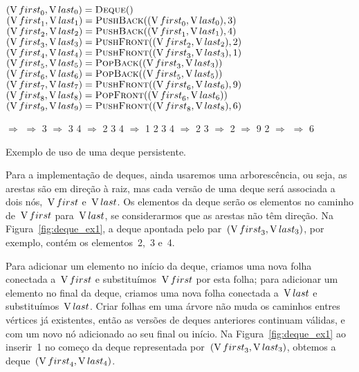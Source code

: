 \documentclass[main.tex]{subfiles}
\begin{document}
\begin{table}
\centering

\begin{subalgorithm}{0.55\textwidth}
\begin{algorithmic}

\State $(\V{first}_0, \V{last}_0) = \Call{Deque}{\null}$
\State $(\V{first}_1, \V{last}_1) = \Call{PushBack}{(\V{first}_0,\V{last}_0), 3}$
\State $(\V{first}_2, \V{last}_2) = \Call{PushBack}{(\V{first}_1,\V{last}_1), 4}$
\State $(\V{first}_3, \V{last}_3) = \Call{PushFront}{(\V{first}_2,\V{last}_2), 2}$
\State $(\V{first}_4, \V{last}_4) = \Call{PushFront}{(\V{first}_3,\V{last}_3), 1}$
\State $(\V{first}_5, \V{last}_5) = \Call{PopBack}{(\V{first}_3,\V{last}_3)}$
\State $(\V{first}_6, \V{last}_6) = \Call{PopBack}{(\V{first}_5,\V{last}_5)}$
\State $(\V{first}_7, \V{last}_7) = \Call{PushFront}{(\V{first}_6,\V{last}_6), 9}$
\State $(\V{first}_8, \V{last}_8) = \Call{PopFront}{(\V{first}_6,\V{last}_6)}$
\State $(\V{first}_9, \V{last}_9) = \Call{PushFront}{(\V{first}_8,\V{last}_8), 6}$

\end{algorithmic}
\end{subalgorithm} \vrule
\begin{subalgorithm}{0.4\textwidth}
\begin{algorithmic}

\State $\Rightarrow$
\State $\Rightarrow$ 3
\State $\Rightarrow$ 3 4
\State $\Rightarrow$ 2 3 4
\State $\Rightarrow$ 1 2 3 4
\State $\Rightarrow$ 2 3
\State $\Rightarrow$ 2
\State $\Rightarrow$ 9 2
\State $\Rightarrow$
\State $\Rightarrow$ 6

\end{algorithmic}
\end{subalgorithm}
\caption{Exemplo de uso de uma deque persistente.} \label{ex:deque}
\end{table}

Para a implementação de deques, ainda usaremos uma arborescência, ou seja, as arestas são em direção à raiz, mas cada versão de uma deque será associada a dois nós,~$\operatorname{V}{first}$ e~$\operatorname{V}{last}$. Os elementos da deque serão os elementos no caminho de~$\operatorname{V}{first}$ para~$\operatorname{V}{last}$, se considerarmos que as arestas não têm direção. Na Figura~\ref{fig:deque_ex1}, a deque apontada pelo par~$(\operatorname{V}{first}_3, \operatorname{V}{last}_3)$, por exemplo, contém os elementos~2,~3 e~4.

Para adicionar um elemento no início da deque, criamos uma nova folha conectada a~$\operatorname{V}{first}$ e substituímos~$\operatorname{V}{first}$ por esta folha; para adicionar um elemento no final da deque, criamos uma nova folha conectada a~$\operatorname{V}{last}$ e substituímos~$\operatorname{V}{last}$. Criar folhas em uma árvore não muda os caminhos entres vértices já existentes, então as versões de deques anteriores continuam válidas, e com um novo nó adicionado ao seu final ou início. Na Figura~\ref{fig:deque_ex1} ao inserir~1 no começo da deque representada por~$(\operatorname{V}{first}_3, \operatorname{V}{last_3})$, obtemos a deque~$(\operatorname{V}{first}_4, \operatorname{V}{last}_4)$.
\end{document}
